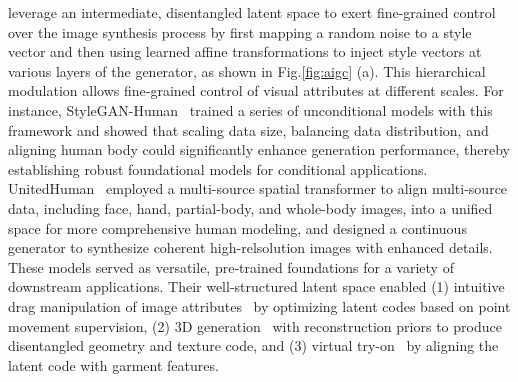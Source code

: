  leverage an intermediate, disentangled latent space to exert fine-grained control over the image synthesis process by first mapping a random noise to a style vector and then using learned affine transformations to inject style vectors at various layers of the generator, as shown in Fig.\ref{fig:aigc} (a).
This hierarchical modulation allows fine‐grained control of visual attributes at different scales.  For instance, StyleGAN-Human~\cite{fu2022stylegan} trained a series of unconditional models with this framework and showed that scaling data size, balancing data distribution, and aligning human body could significantly enhance generation performance, thereby establishing robust foundational models for conditional applications. UnitedHuman~\cite{fu2023unitedhuman} employed a multi-source spatial transformer to align multi-source data, including face, hand, partial-body, and whole-body images, into a unified space for more comprehensive human modeling, and designed a continuous generator to synthesize coherent high-relsolution images with enhanced details. These models served as versatile, pre‐trained foundations for a variety of downstream applications.
Their well-structured latent space enabled (1) intuitive drag manipulation of image attributes~\cite{pan2023drag} by optimizing latent codes based on point movement supervision,
(2) 3D generation~\cite{xiong2023get3dhuman} with reconstruction priors to produce disentangled geometry and texture code, and (3) virtual try-on~\cite{yoshikawa2023stylehumanclip} by aligning the latent code with garment features.


